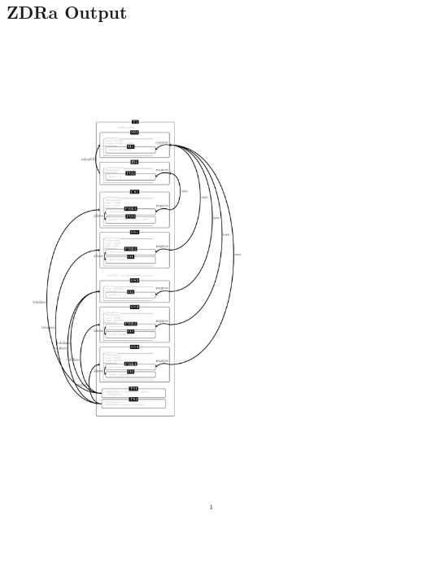 \subsection{ZDRa Output}
\label{app:bb2o}

\noindent \includegraphics[clip, trim=0cm 4cm 6cm 4.2cm]{examples/bb/2comp.pdf}

%

